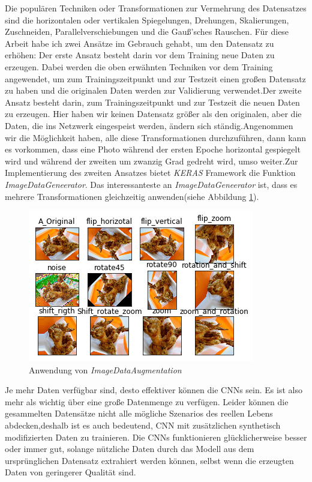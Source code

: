 \documentclass[12pt,a4paper]{scrartcl}
\numberwithin{equation}{section}
\begin{document}
Die populären Techniken oder Transformationen zur Vermehrung des Datensatzes sind die horizontalen oder vertikalen Spiegelungen, Drehungen, Skalierungen, Zuschneiden, Parallelverschiebungen und die Gauß'sches Rauschen.
Für diese Arbeit habe ich zwei Ansätze im Gebrauch gehabt, um den Datensatz zu erhöhen:
Der erste Ansatz besteht darin vor dem Training neue Daten zu erzeugen. Dabei werden die oben erwähnten Techniken vor dem Training angewendet, um zum Trainingszeitpunkt und zur Testzeit einen großen Datensatz zu haben und die originalen Daten werden zur Validierung verwendet.Der zweite Ansatz besteht darin, zum Trainingszeitpunkt und zur Testzeit die neuen Daten zu erzeugen. Hier haben wir keinen Datensatz größer als den originalen, aber die Daten, die ins Netzwerk eingespeist werden, ändern sich ständig.Angenommen wir die Möglichkeit haben, alle diese Transformationen durchzuführen, dann kann es vorkommen, dass eine Photo während der ersten Epoche horizontal gespiegelt wird und während der zweiten um  zwanzig Grad gedreht wird, umso weiter.Zur Implementierung des zweiten Ansatzes bietet \textit{KERAS} Framework die Funktion \textit{ImageDataGeneerator}. Das interessanteste an \textit{ImageDataGeneerator} ist, dass es mehrere Transformationen gleichzeitig anwenden(siehe Abbildung \ref{fig:ImageDataAugmentation}).

\begin{figure}[h]
	\centering
	\includegraphics{ImageDataAugmaentation.png}
	\caption{Anwendung von \textit{ImageDataAugmentation} }
	\label{fig:ImageDataAugmentation}
\end{figure}

Je mehr Daten verfügbar sind, desto effektiver können die \acsp{CNN} sein. Es ist also mehr als wichtig über eine große Datenmenge zu verfügen. Leider können die gesammelten Datensätze nicht alle mögliche Szenarios des reellen Lebens abdecken,deshalb ist es auch bedeutend, \ac{CNN}  mit zusätzlichen synthetisch modifizierten Daten zu trainieren. Die \acsp{CNN} funktionieren glücklicherweise besser oder immer gut, solange nützliche Daten durch das Modell aus dem ursprünglichen Datensatz extrahiert werden können, selbst wenn die erzeugten Daten von geringerer Qualität sind.\\
\end{document}
